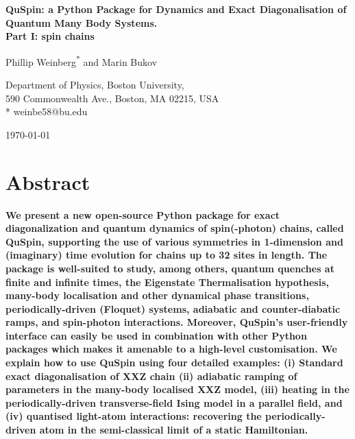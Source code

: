 \documentclass{SciPost}
\newcommand\0{\scalebox{-1}[1]{0}}
\begin{document}
\begin{center}{\Large \textbf{
QuSpin: a Python Package for Dynamics and Exact Diagonalisation of Quantum Many Body Systems.\\
\large Part I: spin chains
}}\end{center}

\begin{center}
Phillip Weinberg\textsuperscript{*} and Marin Bukov
\end{center}

\begin{center}
Department of Physics, Boston University, \\
590 Commonwealth Ave., Boston, MA 02215, USA
\\
* weinbe58@bu.edu
\end{center}

\begin{center}
\today
\end{center}


\section*{Abstract}
{\bf 
We present a new open-source Python package for exact diagonalization and quantum dynamics of spin(-photon) chains, called QuSpin, supporting the use of various symmetries in 1-dimension and (imaginary) time evolution for chains up to 32 sites in length. The package is well-suited to study, among others, quantum quenches at finite and infinite times, the Eigenstate Thermalisation hypothesis, many-body localisation and other dynamical phase transitions, periodically-driven (Floquet) systems, adiabatic and counter-diabatic ramps, and spin-photon interactions. Moreover, QuSpin's user-friendly interface can easily be used in combination with other Python packages which makes it amenable to a high-level customisation. We explain how to use QuSpin using four detailed examples: (i) Standard exact diagonalisation of XXZ chain (ii) adiabatic ramping of parameters in the many-body localised XXZ model, (iii) heating in the periodically-driven transverse-field Ising model in a parallel field, and (iv) quantised light-atom interactions: recovering the periodically-driven atom in the semi-classical limit of a static Hamiltonian.
}
\end{document}
